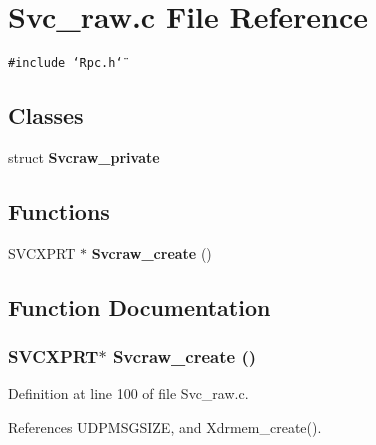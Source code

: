 \section{Svc\_\-raw.c File Reference}
\label{Svc__raw_8c}
{\tt \#include \char`\"{}Rpc.h\char`\"{}}\par
\subsection*{Classes}
\begin{CompactItemize}
\item 
struct {\bf Svcraw\_\-private}
\end{CompactItemize}
\subsection*{Functions}
\begin{CompactItemize}
\item 
SVCXPRT $\ast$ {\bf Svcraw\_\-create} ()
\end{CompactItemize}


\subsection{Function Documentation}
\subsubsection{\setlength{\rightskip}{0pt plus 5cm}SVCXPRT$\ast$ Svcraw\_\-create ()}\label{Svc__raw_8c_a8}




Definition at line 100 of file Svc\_\-raw.c.

References UDPMSGSIZE, and Xdrmem\_\-create().